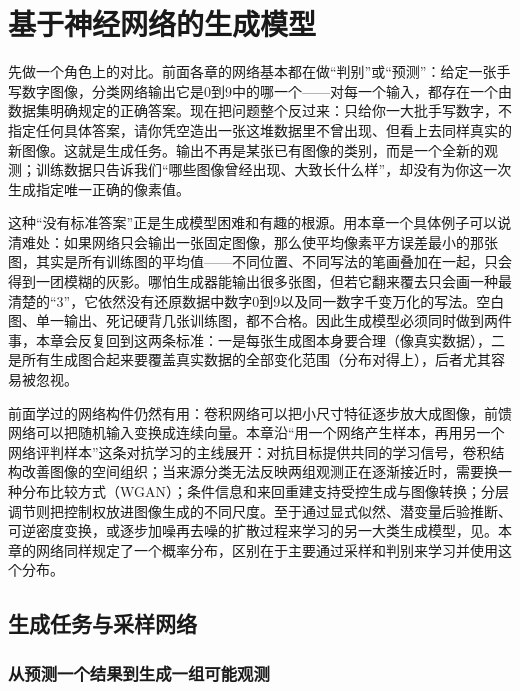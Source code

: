 \chapter{基于神经网络的生成模型}
\label{chap:neural-generative-models}

先做一个角色上的对比。前面各章的网络基本都在做“判别”或“预测”：给定一张手写数字图像，分类网络输出它是0到9中的哪一个——对每一个输入，都存在一个由数据集明确规定的正确答案。现在把问题整个反过来：只给你一大批手写数字，不指定任何具体答案，请你凭空造出一张这堆数据里不曾出现、但看上去同样真实的新图像。这就是生成任务。输出不再是某张已有图像的类别，而是一个全新的观测；训练数据只告诉我们“哪些图像曾经出现、大致长什么样”，却没有为你这一次生成指定唯一正确的像素值。

这种“没有标准答案”正是生成模型困难和有趣的根源。用本章一个具体例子可以说清难处：如果网络只会输出一张固定图像，那么使平均像素平方误差最小的那张图，其实是所有训练图的平均值——不同位置、不同写法的笔画叠加在一起，只会得到一团模糊的灰影。哪怕生成器能输出很多张图，但若它翻来覆去只会画一种最清楚的“3”，它依然没有还原数据中数字0到9以及同一数字千变万化的写法。空白图、单一输出、死记硬背几张训练图，都不合格。因此生成模型必须同时做到两件事，本章会反复回到这两条标准：一是每张生成图本身要合理（像真实数据），二是所有生成图合起来要覆盖真实数据的全部变化范围（分布对得上），后者尤其容易被忽视。

前面学过的网络构件仍然有用：卷积网络可以把小尺寸特征逐步放大成图像，前馈网络可以把随机输入变换成连续向量。本章沿“用一个网络产生样本，再用另一个网络评判样本”这条对抗学习的主线展开：对抗目标提供共同的学习信号，卷积结构改善图像的空间组织；当来源分类无法反映两组观测正在逐渐接近时，需要换一种分布比较方式（WGAN）；条件信息和来回重建支持受控生成与图像转换；分层调节则把控制权放进图像生成的不同尺度。至于通过显式似然、潜变量后验推断、可逆密度变换，或逐步加噪再去噪的扩散过程来学习的另一大类生成模型，见。本章的网络同样规定了一个概率分布，区别在于主要通过采样和判别来学习并使用这个分布。

\section{生成任务与采样网络}
\label{sec:neural-generative-task}

\subsection{从预测一个结果到生成一组可能观测}
\label{sec:neural-generative-observations}

